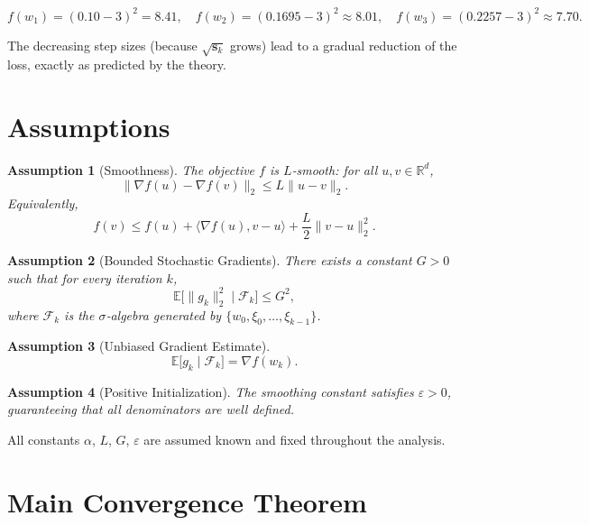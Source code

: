 \documentclass{article}
\newtheorem{assumption}{Assumption}
\begin{document}
\[
f(w_1)= (0.10-3)^2=8.41,\quad
f(w_2)= (0.1695-3)^2\approx 8.01,\quad
f(w_3)= (0.2257-3)^2\approx 7.70 .
\]

The decreasing step sizes (because $\sqrt{\mathbf{s}_k}$ grows) lead to a gradual reduction of the loss, exactly as predicted by the theory.

\section*{Assumptions}

\begin{assumption}[Smoothness]\label{as:smooth}
The objective $f$ is $L$‑smooth: for all $u,v\in\mathbb{R}^{d}$,
\[
\|\nabla f(u)-\nabla f(v)\|_2\le L\|u-v\|_2 .
\]
Equivalently,
\[
f(v)\le f(u)+\langle\nabla f(u),v-u\rangle+\frac{L}{2}\|v-u\|_2^{2}.
\]
\end{assumption}

\begin{assumption}[Bounded Stochastic Gradients]\label{as:bound}
There exists a constant $G>0$ such that for every iteration $k$,
\[
\mathbb{E}\bigl[\|g_k\|_2^{2}\mid\mathcal{F}_k\bigr]\le G^{2},
\]
where $\mathcal{F}_k$ is the $\sigma$‑algebra generated by $\{w_0,\xi_0,\dots,\xi_{k-1}\}$.
\end{assumption}

\begin{assumption}[Unbiased Gradient Estimate]\label{as:unbiased}
\[
\mathbb{E}\bigl[g_k\mid\mathcal{F}_k\bigr]=\nabla f(w_k).
\]
\end{assumption}

\begin{assumption}[Positive Initialization]\label{as:epsilon}
The smoothing constant satisfies $\varepsilon>0$, guaranteeing that all denominators are well defined.
\end{assumption}

All constants $\alpha$, $L$, $G$, $\varepsilon$ are assumed known and fixed throughout the analysis.

\section*{Main Convergence Theorem}
\end{document}
